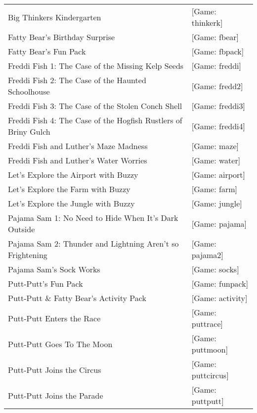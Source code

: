 \begin{itemize}
\begin{tabular}[h]{ll}
    Big Thinkers Kindergarten&                                     [Game: thinkerk]\\
    Fatty Bear's Birthday Surprise&                                [Game: fbear]\\
    Fatty Bear's Fun Pack&                                         [Game: fbpack]\\
    Freddi Fish 1: The Case of the Missing Kelp Seeds&             [Game: freddi]\\
    Freddi Fish 2: The Case of the Haunted Schoolhouse&            [Game: fredd2]\\
    Freddi Fish 3: The Case of the Stolen Conch Shell&             [Game: freddi3]\\
    Freddi Fish 4: The Case of the Hogfish Rustlers of Briny Gulch&[Game: freddi4]\\
    Freddi Fish and Luther's Maze Madness&                         [Game: maze]\\
    Freddi Fish and Luther's Water Worries&                        [Game: water]\\
    Let's Explore the Airport with Buzzy&                          [Game: airport]\\
    Let's Explore the Farm with Buzzy&                             [Game: farm]\\
    Let's Explore the Jungle with Buzzy&                           [Game: jungle]\\
    Pajama Sam 1: No Need to Hide When It's Dark Outside&          [Game: pajama]\\
    Pajama Sam 2: Thunder and Lightning Aren't so Frightening&     [Game: pajama2]\\
    Pajama Sam's Sock Works&                                       [Game: socks]\\
    Putt-Putt's Fun Pack&                                          [Game: funpack]\\
    Putt-Putt \& Fatty Bear's Activity Pack&                       [Game: activity]\\
    Putt-Putt Enters the Race&                                     [Game: puttrace]\\
    Putt-Putt Goes To The Moon&                                    [Game: puttmoon]\\
    Putt-Putt Joins the Circus&                                    [Game: puttcircus]\\
    Putt-Putt Joins the Parade&                                    [Game: puttputt]\\

\end{tabular}
\end{itemize}
